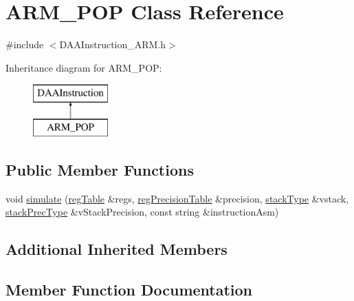 \hypertarget{classARM__POP}{}\section{A\+R\+M\+\_\+\+P\+OP Class Reference}
\label{classARM__POP}


{\ttfamily \#include $<$D\+A\+A\+Instruction\+\_\+\+A\+R\+M.\+h$>$}

Inheritance diagram for A\+R\+M\+\_\+\+P\+OP\+:\begin{figure}[H]
\begin{center}
\leavevmode
\includegraphics[height=2.000000cm]{classARM__POP}
\end{center}
\end{figure}
\subsection*{Public Member Functions}
\begin{DoxyCompactItemize}
\item 
void \hyperlink{classARM__POP_abdf7c32b3daaed8c6c4c1c984d90ab27}{simulate} (\hyperlink{DAAInstruction_8h_af0fae93a861de9cf37988d5673cac523}{reg\+Table} \&regs, \hyperlink{DAAInstruction_8h_a0e8cae02815a5f8adc750122d790b455}{reg\+Precision\+Table} \&precision, \hyperlink{DAAInstruction_8h_a1b0e70ac1a04f06c8132055ed01f589f}{stack\+Type} \&vstack, \hyperlink{DAAInstruction_8h_ac5cb793e9dac3fa9693da78b7e29ab30}{stack\+Prec\+Type} \&v\+Stack\+Precision, const string \&instruction\+Asm)
\end{DoxyCompactItemize}
\subsection*{Additional Inherited Members}


\subsection{Member Function Documentation}
\mbox{\label{classARM__POP_abdf7c32b3daaed8c6c4c1c984d90ab27}} 
